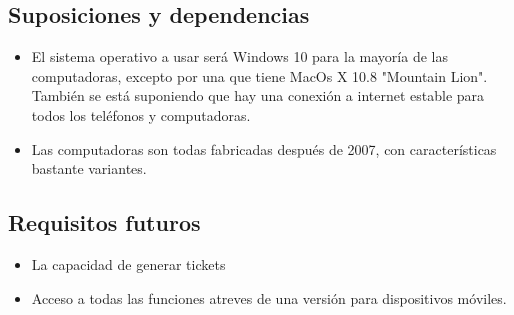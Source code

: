 \subsection{Suposiciones y dependencias}
\begin{itemize}
\item El sistema operativo a usar será Windows 10 para la mayoría de las computadoras, excepto por una que tiene MacOs X 10.8 "Mountain Lion". También se está suponiendo que hay una conexión a internet estable para todos los teléfonos y computadoras.
\item Las computadoras son todas fabricadas después de 2007, con características bastante variantes.
\end{itemize}

\subsection{Requisitos futuros}
\begin{itemize}
\item La capacidad de generar tickets
\item Acceso a todas las funciones atreves de una versión para dispositivos móviles.
\end{itemize}


